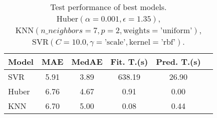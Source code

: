\begin{table}
    \centering
    \caption{Test performance of best models. $ \text{Huber}(\alpha=0.001, \epsilon=1.35)$, $ \text{KNN}(n\_neighbors=7, p=2, \text{weights}=\text{'uniform'})$, $ \text{SVR}(C=10.0, \gamma=\text{'scale'}, \text{kernel}=\text{'rbf'})$.}
    \label{tab:year_song_test}
    \begin{tabular}{|l|c|c|c|c|c|}
    \toprule
    Model & MAE & MedAE & Fit. T.(s) & Pred. T.(s) \\
    \midrule
    SVR & 5.91 & 3.89 & 638.19 & 26.90 \\
    Huber & 6.76 & 4.67 & 0.91 & 0.00 \\
    KNN & 6.70 & 5.00 & 0.08 & 0.44 \\
    \bottomrule
    \end{tabular}
\end{table}
